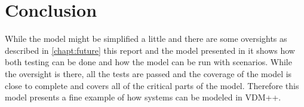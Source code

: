 \chapter{Conclusion}

While the model might be simplified a little and there are some oversights as
described in \cref{chapt:future} this report and the model presented in it
shows how both testing can be done and how the model can be run with scenarios.
While the oversight is there, all the tests are passed and the coverage of the
model is close to complete and covers all of the critical parts of the model.
Therefore this model presents a fine example of how systems can be modeled in
VDM++.